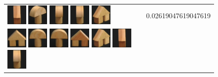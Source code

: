 {\begin{figure}[p]
\begin{tabular}{m{11cm} | m{3cm} |}
\includegraphics[width=1cm]{coil/beeld-44.eps}
\includegraphics[width=1cm]{coil/beeld-3.eps}
\includegraphics[width=1cm]{coil/beeld-5.eps}
\includegraphics[width=1cm]{coil/beeld-2.eps}
\includegraphics[width=1cm]{coil/beeld-45.eps}
& {\scriptsize 0.02619047619047619}
\\
\includegraphics[width=1cm]{coil/beeld-42.eps}
\includegraphics[width=1cm]{coil/beeld-0.eps}
\includegraphics[width=1cm]{coil/beeld-1.eps}
\includegraphics[width=1cm]{coil/beeld-43.eps}
\includegraphics[width=1cm]{coil/beeld-45.eps}
\includegraphics[width=1cm]{coil/beeld-44.eps}
\includegraphics[width=1cm]{coil/beeld-2.eps}

\end{tabular}
\end{figure}}
